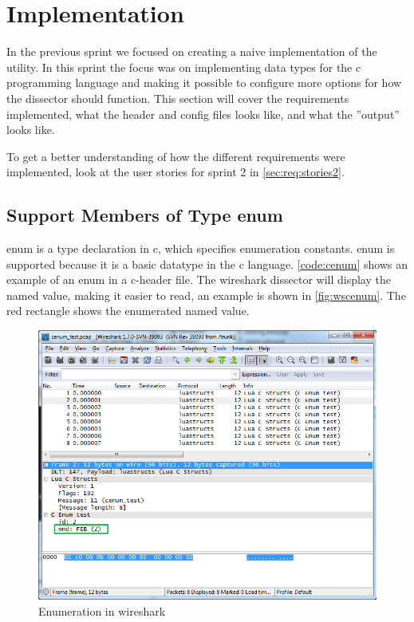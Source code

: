 \section{Implementation}
\label{sec:sp2:impl}
In the previous sprint we focused on creating a naive implementation of the 
\gls{utility}. In this sprint the focus was on implementing data types for the 
\Gls{c} programming language and making it possible to configure more options for how 
the \gls{dissector} should function. This section will cover the requirements 
implemented, what the \gls{header} and config files looks like, and what the ''output'' looks like.

To get a better understanding of how the different requirements were implemented,
look at the user stories for sprint 2 in \autoref{sec:req:stories2}.

\subsection{Support Members of Type \Gls{enum}}

\label{sec:supportenum}
\Gls{enum} is a type declaration in \Gls{c}, which specifies enumeration constants.  \Gls{enum} 
is supported because it is a basic datatype in the \Gls{c} language. 
\autoref{code:cenum} shows an example of an \gls{enum} in a \Gls{c}-\gls{header} file. The 
\Gls{wireshark} \gls{dissector} will display the named value, making it 
easier to read, an example is shown in \autoref{fig:wscenum}. The red 
rectangle shows the \gls{enumerated named value}.

\begin{figure}[ht]
	\center
	\includegraphics[width=\textwidth]{./sprints/img/wireshark_cenum}
	\caption{Enumeration in \Gls{wireshark}\label{fig:wscenum}}
\end{figure}

